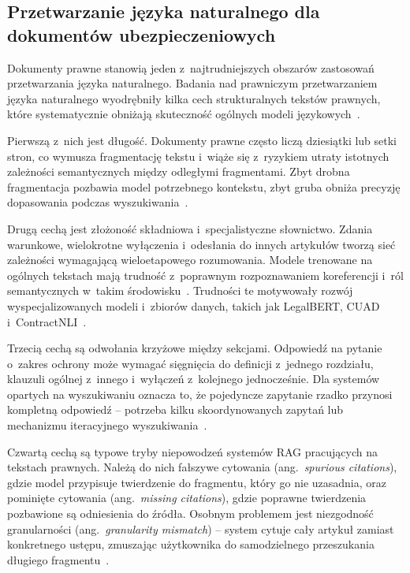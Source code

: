 \subsection{Przetwarzanie języka naturalnego dla dokumentów ubezpieczeniowych}\label{subsec:przetwarzanie-jezyka-naturlanego-dla-dokumentow-ubezpieczeniowych}

Dokumenty prawne stanowią jeden z~najtrudniejszych obszarów zastosowań
przetwarzania języka naturalnego. Badania nad prawniczym przetwarzaniem języka
naturalnego wyodrębniły kilka cech strukturalnych tekstów prawnych, które
systematycznie obniżają skuteczność ogólnych modeli
językowych~\cite{koreeda2021contractnli, chalkidis2020legal}.

Pierwszą z~nich jest długość. Dokumenty prawne często liczą dziesiątki lub
setki stron, co wymusza fragmentację tekstu i~wiąże się z~ryzykiem utraty
istotnych zależności semantycznych między odległymi fragmentami. Zbyt drobna
fragmentacja pozbawia model potrzebnego kontekstu, zbyt gruba obniża precyzję
dopasowania podczas wyszukiwania~\cite{barnett2024seven}.

Drugą cechą jest złożoność składniowa i~specjalistyczne słownictwo. Zdania
warunkowe, wielokrotne wyłączenia i~odesłania do innych artykułów tworzą sieć
zależności wymagającą wieloetapowego rozumowania. Modele trenowane na ogólnych
tekstach mają trudność z~poprawnym rozpoznawaniem koreferencji i~ról
semantycznych w~takim środowisku~\cite{hendrycks2021cuad}. Trudności te
motywowały rozwój wyspecjalizowanych modeli i~zbiorów danych, takich jak
LegalBERT, CUAD i~ContractNLI~\cite{chalkidis2020legal, hendrycks2021cuad,
  koreeda2021contractnli}.

Trzecią cechą są odwołania krzyżowe między sekcjami. Odpowiedź na pytanie
o~zakres ochrony może wymagać sięgnięcia do definicji z~jednego rozdziału,
klauzuli ogólnej z~innego i~wyłączeń z~kolejnego jednocześnie. Dla systemów
opartych na wyszukiwaniu oznacza to, że pojedyncze zapytanie rzadko przynosi
kompletną odpowiedź -- potrzeba kilku skoordynowanych zapytań lub mechanizmu
iteracyjnego wyszukiwania~\cite{koreeda2021contractnli, yang2018hotpotqa}.

Czwartą cechą są typowe tryby niepowodzeń systemów RAG pracujących na tekstach
prawnych. Należą do nich fałszywe cytowania (ang.~\textit{spurious citations}),
gdzie model przypisuje twierdzenie do fragmentu, który go nie uzasadnia, oraz
pominięte cytowania (ang.~\textit{missing citations}), gdzie poprawne
twierdzenia pozbawione są odniesienia do źródła. Osobnym problemem jest
niezgodność granularności (ang.~\textit{granularity mismatch}) -- system cytuje
cały artykuł zamiast konkretnego ustępu, zmuszając użytkownika do samodzielnego
przeszukania długiego fragmentu~\cite{koreeda2021contractnli}.

